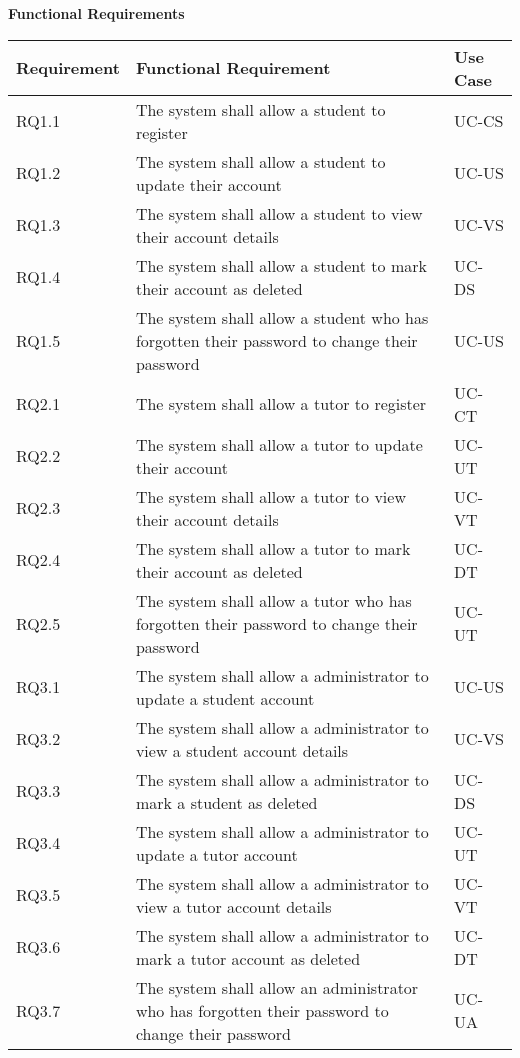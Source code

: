 \documentclass[12pt]{article}
\begin{document}
\begin{flushleft}
\textbf{Functional Requirements}
\end{flushleft}

{
\centering
\begin{longtable}{| l | p{10cm}| l |}
			\hline			
			\textbf{Requirement} & \textbf{Functional Requirement} & \textbf{Use Case}
			
			\\ \hline RQ1.1 & The system shall allow a student to register  & UC-CS \\ \hline 
			RQ1.2 & The system shall allow a student to update their account & UC-US \\ \hline  
			RQ1.3 & The system shall allow a student to view their account details  & UC-VS \\ \hline 
			RQ1.4 & The system shall allow a student to mark their account as deleted & UC-DS  \\ \hline 
			RQ1.5 & The system shall allow a student who has forgotten their password to change their password & UC-US \\ \hline	
			
			
			RQ2.1 & The system shall allow a tutor to register & UC-CT \\ \hline
			RQ2.2 & The system shall allow a tutor to update their account  & UC-UT \\ \hline
			RQ2.3 & The system shall allow a tutor to view their account details & UC-VT \\ \hline
			RQ2.4 & The system shall allow a tutor to mark their account as deleted & UC-DT \\ \hline  
			RQ2.5 & The system shall allow a tutor who has forgotten their password to change their password & UC-UT \\ \hline	
						
			RQ3.1 & The system shall allow a administrator to update a student account & UC-US \\ \hline  
			RQ3.2 & The system shall allow a administrator to view a student account details  & UC-VS \\ \hline 
			RQ3.3 & The system shall allow a administrator to mark a student as deleted & UC-DS  \\ \hline 
			RQ3.4 & The system shall allow a administrator to update a tutor account  & UC-UT \\ \hline
			RQ3.5 & The system shall allow a administrator to view a tutor account details & UC-VT \\ \hline
			RQ3.6 & The system shall allow a administrator to mark a tutor account as deleted & UC-DT \\ \hline
			RQ3.7 & The system shall allow an administrator  who has forgotten their password to change their password & UC-UA \\ \hline	
			

\end{longtable}}
\end{document}

